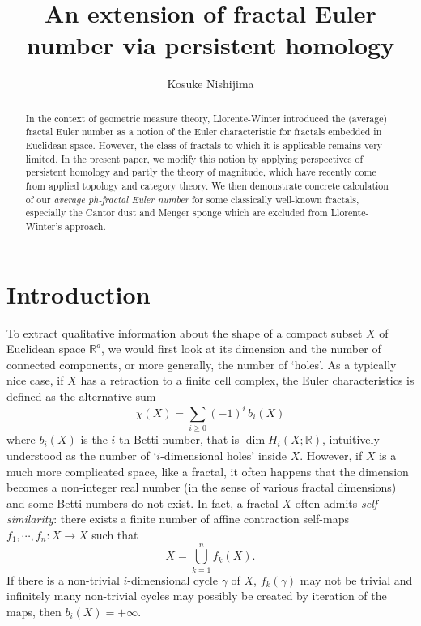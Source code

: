\documentclass[12pt]{amsart}
\numberwithin{equation}{section}
\newcommand{\R}{\mathbb{R}}
\begin{document}
\setlength{\baselineskip}{15pt}

\title[Fractal Betti numbers]
{An extension of fractal Euler number via persistent homology}
\author[K.~Nishijima]{Kosuke Nishijima}
\address[K.~Nishijima]{
Department of Pure and Applied Mathematics, Graduate School of Fundamental Science and Engineering, Waseda University, Tokyo 169-8555, Japan}
\dedicatory{}


\begin{abstract} 
In the context of geometric measure theory, Llorente-Winter introduced the (average) fractal Euler number as a notion of the Euler characteristic for fractals embedded in Euclidean space. However, the class of fractals to which it is applicable remains very limited. In the present paper, we modify this notion by  applying perspectives of persistent homology and partly the theory of magnitude, which have recently come from applied topology and category theory. We then demonstrate concrete calculation of our {\em average ph-fractal Euler number} for some classically well-known fractals, especially  the Cantor dust and Menger sponge which are excluded from Llorente-Winter's approach. 
\end{abstract}
\maketitle

\section{Introduction}
To extract qualitative information about the shape of a compact subset $X$ of Euclidean space $\R^d$, 
we would first look at its dimension and the number of connected components, or more generally, the number of  `holes'. As a typically nice case, if $X$ has a retraction to a finite cell complex, the Euler characteristics is defined as the alternative sum 
$$\chi(X)=\sum_{i \ge 0} (-1)^i \, b_i(X)$$
where $b_i(X)$ is the $i$-th Betti number, that is $\dim H_i(X; \R)$, intuitively understood as the number of `$i$-dimensional holes' inside $X$. 
However, if $X$ is a much more complicated space, like a fractal, it often happens that the dimension becomes a non-integer real number (in the sense of various fractal dimensions) and some Betti numbers do not exist. 
In fact, a fractal $X$ often admits {\em self-similarity}: 
there exists a finite number of affine contraction self-maps $f_1, \cdots, f_n: X \to X$ such that 
$$X=\bigcup_{k=1}^n f_k(X).$$
If there is a non-trivial $i$-dimensional cycle $\gamma$ of $X$, $f_k(\gamma)$ may not be trivial and infinitely many non-trivial cycles may possibly be created by iteration of the maps, then $b_i(X)=+\infty$. 
\end{document}
